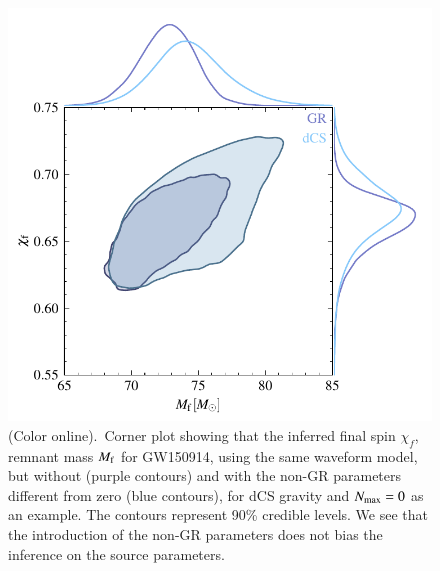 \documentclass[twocolumn,
               prd,
               aps,
               superscriptaddress,
               tightenlines,
               nofootinbib,
               eqsecnum,
               amsfonts,
               amsmath,
               longbibliography]{revtex4-1}
\begin{document}
\begin{figure}[t]
\includegraphics[width=0.9\columnwidth]{figs/tmp_GW150914_intrinsic_params_remnant.pdf}
\caption{(Color online).~Corner plot showing that the inferred final spin $\chi_f$,
remnant mass $M_{\rm f}$ for GW150914, using the same waveform model,
but without (purple contours) and with the non-GR parameters
different from zero (blue contours), for
dCS gravity and $N_{\rm max}=0$ as an example.
%
The contours represent 90\% credible levels.
%
We see that the introduction of the non-GR parameters does not bias the
inference on the source parameters.
}
\label{fig:corner_plot}
\end{figure}
\end{document}
